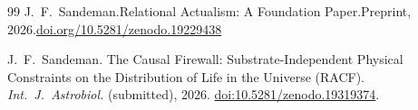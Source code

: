 \documentclass[11pt,a4paper]{article}
\theoremstyle{plain}
\theoremstyle{definition}
\theoremstyle{remark}
\begin{document}
\begin{thebibliography}{99}
J.~F.~Sandeman.\newblock Relational Actualism: A Foundation Paper.\newblock Preprint, 2026.\newblock \href{https://doi.org/10.5281/zenodo.19229438}{doi.org/10.5281/zenodo.19229438}


J.~F.~Sandeman.
\newblock The Causal Firewall: Substrate-Independent Physical Constraints
  on the Distribution of Life in the Universe (RACF).
\newblock \textit{Int.\ J.\ Astrobiol.} (submitted), 2026.
\newblock \href{https://doi.org/10.5281/zenodo.19319374}%
  {doi:10.5281/zenodo.19319374}.

\end{thebibliography}
\end{document}
